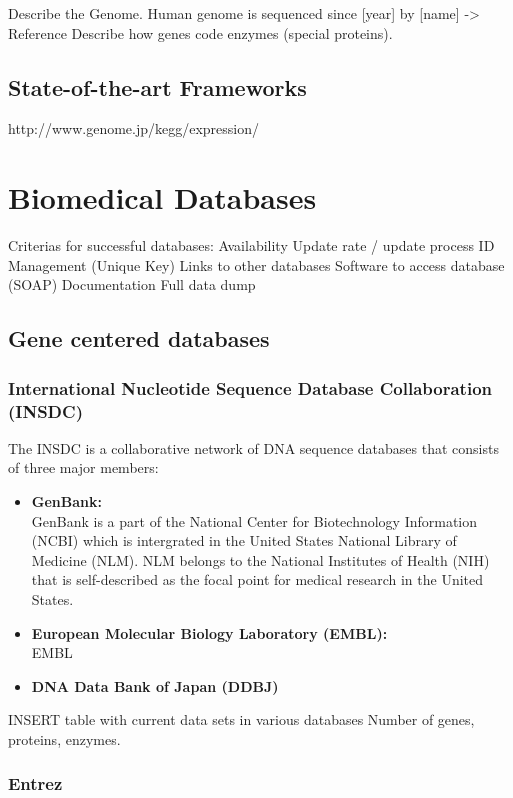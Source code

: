 Describe the Genome.
Human genome is sequenced since [year] by [name] -> Reference 
Describe how genes code enzymes (special proteins).
\subsection{State-of-the-art Frameworks}

http://www.genome.jp/kegg/expression/


\section{Biomedical Databases}

Criterias for successful databases: 
Availability
Update rate / update process
ID Management (Unique Key)
Links to other databases
Software to access database (SOAP)
Documentation
Full data dump

\subsection{Gene centered databases}

\subsubsection{International Nucleotide Sequence Database Collaboration (INSDC)}

The INSDC is a collaborative network of DNA sequence databases that consists of three major members:
\begin{itemize}
 \item \textbf{GenBank:} \\
 GenBank is a part of the National Center for Biotechnology Information (NCBI) which is intergrated in the United States National Library of Medicine (NLM). NLM belongs to the National Institutes of Health (NIH) that is self-described as the focal point for medical research in the United States.
 \item \textbf{European Molecular Biology Laboratory (EMBL):} \\
 EMBL
 \item \textbf{DNA Data Bank of Japan (DDBJ)} \\
\end{itemize}

INSERT table with current data sets in various databases
Number of genes, proteins, enzymes.

\subsubsection{Entrez}

